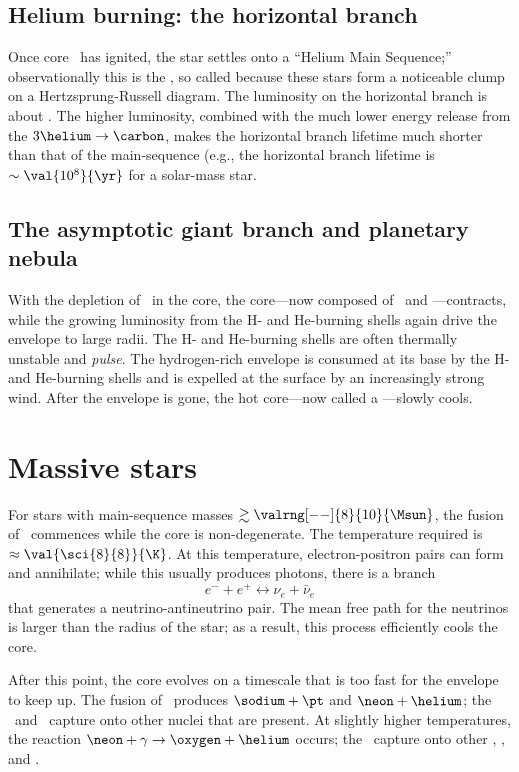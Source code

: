 \subsection{Helium burning: the horizontal branch}

Once core \helium\ has ignited, the star settles onto a ``Helium Main Sequence;'' observationally this is the , so called because these stars form a noticeable clump on a Hertzsprung-Russell diagram.  The luminosity on the horizontal branch is about .  The higher luminosity, combined with the much lower energy release from the $3\helium\to\carbon$, makes the horizontal branch lifetime much shorter than that of the main-sequence (e.g., the horizontal branch lifetime is $\sim \val{10^{8}}{\yr}$ for a solar-mass star.

\subsection{The asymptotic giant branch and planetary nebula}

With the depletion of \helium\ in the core, the core---now composed of \carbon\ and \oxygen---contracts, while the growing luminosity from the H- and He-burning shells again drive the envelope to large radii.  The H- and He-burning shells are often thermally unstable and \emph{pulse}.  The hydrogen-rich envelope is consumed at its base by the H- and He-burning shells and is expelled at the surface by an increasingly strong wind.  After the envelope is gone, the hot core---now called a ---slowly cools.

\section{Massive stars}

For stars with main-sequence masses $\gtrsim \valrng[--]{8}{10}{\Msun}$, the fusion of \carbon\ commences while the core is non-degenerate.  The temperature required is $\approx\val{\sci{8}{8}}{\K}$.  At this temperature, electron-positron pairs can form and annihilate; while this usually produces photons, there is a branch
\[ e^{-}+e^{+} \longleftrightarrow \nu_{e} + \bar{\nu}_{e}\]
that generates a neutrino-antineutrino pair. The mean free path for the neutrinos is larger than the radius of the star; as a result, this process efficiently cools the core.

After this point, the core evolves on a timescale that is too fast for the envelope to keep up.  The fusion of \carbon\ produces $\sodium+\pt$ and $\neon+\helium$; the \pt\ and \helium\ capture onto other nuclei that are present.  At slightly higher temperatures, the reaction $\neon+\gamma \to \oxygen+\helium$ occurs; the \helium\ capture onto other \oxygen, \neon, and \magnesium.

